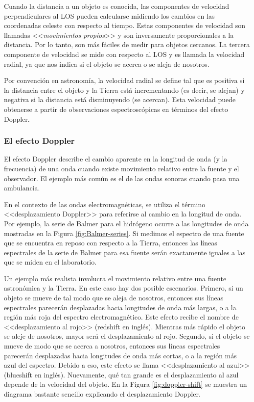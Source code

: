 Cuando la distancia a un objeto es conocida, las componentes de velocidad perpendiculares al LOS pueden calcularse midiendo los cambios en las coordenadas celeste con respecto al tiempo. Estas componentes de velocidad son llamadas <<\emph{movimientos propios}>> y son inversamente proporcionales a la distancia. Por lo tanto, son más fáciles de medir para objetos cercanos. La tercera componente de velocidad se mide con respecto al LOS y es llamada la velocidad radial, ya que nos indica si el objeto se acerca o se aleja de nosotros. 

Por convención en astronomía, la velocidad radial se define tal que es positiva si la distancia entre el objeto y la Tierra está incrementando (es decir, se alejan) y negativa si la distancia está disminuyendo (se acercan). Esta velocidad puede obtenerse a partir de observaciones espectroscópicas en términos del efecto Doppler.

\subsubsection{El efecto Doppler}
El efecto Doppler describe el cambio aparente en la longitud de onda (y la frecuencia) de una onda cuando existe movimiento relativo entre la fuente y el observador. El ejemplo más común es el de las ondas sonoras cuando pasa una ambulancia. 

En el contexto de las ondas electromagnéticas, se utiliza el término <<desplazamiento Doppler>> para referirse al cambio en la longitud de onda. Por ejemplo, la serie de Balmer para el hidrógeno ocurre a las longitudes de onda mostradas en la Figura \ref{fig:Balmer-series}. Si medimos el espectro de una fuente que se encuentra en reposo con respecto a la Tierra, entonces las líneas espectrales de la serie de Balmer para esa fuente serán exactamente iguales a las que se miden en el laboratorio. 

Un ejemplo más realista involucra el movimiento relativo entre una fuente astronómica y la Tierra. En este caso hay dos posible escenarios. Primero, si un objeto se mueve de tal modo que se aleja de nosotros, entonces sus líneas espectrales parecerán desplazadas hacia longitudes de onda más largas, o a la región más roja del espectro electromagnético. Este efecto recibe el nombre de <<desplazamiento al rojo>> (redshift en inglés). Mientras más rápido el objeto se aleje de nosotros, mayor será el desplazamiento al rojo. Segundo, si el objeto se mueve de modo que se acerca a nosotros, entonces sus líneas espectrales parecerán desplazadas hacia longitudes de onda más cortas, o a la región más azul del espectro. Debido a eso, este efecto se llama <<desplazamiento al azul>> (blueshift en inglés). Nuevamente, qué tan grande es el desplazamiento al azul depende de la velocidad del objeto. En la Figura \ref{fig:doppler-shift} se muestra un diagrama bastante sencillo explicando el desplazamiento Doppler. 

